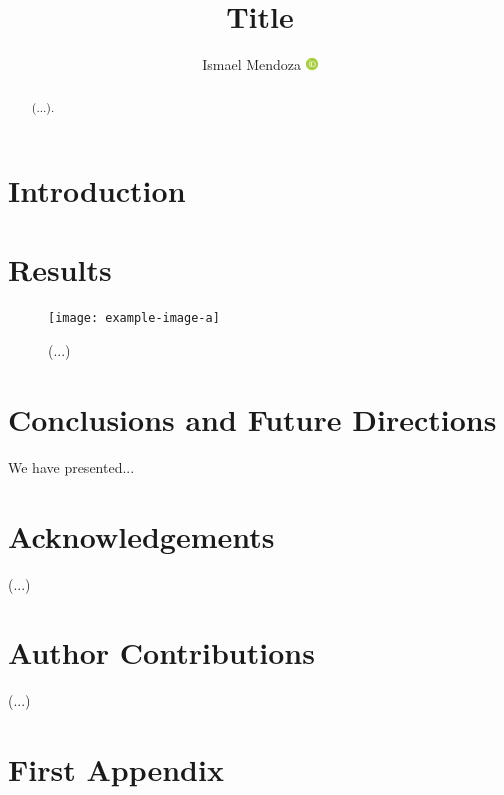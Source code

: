\documentclass[twocolumn,twocolappendix]{openjournal}
\begin{document}
\title{Title}

\author{Ismael Mendoza \hskip2pt\href{https://orcid.org/0000-0002-6313-4597}{\includegraphics[width=9pt]{Orcid-ID.png}}}

\begin{abstract}
(...).  
\end{abstract}

\section{Introduction} \label{sec:intro}

\citep{galsim:2015}


\section{Results}  \label{sec:results}


\begin{figure}
\texttt{[image: example-image-a]}
\caption{
    (...)
    }
\label{fig:resultsA}
\end{figure}


\section{Conclusions and Future Directions}

We have presented...


\section*{Acknowledgements} 

(...)


\section*{Author Contributions} 

(...)

\appendix
\section*{First Appendix}\label{app:first}

{}



\end{document}
